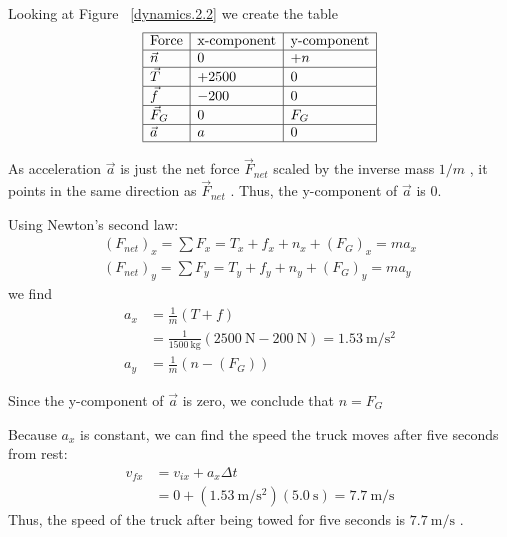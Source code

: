 \begin{Answer}[ref={dynamics.2.1}]

    Looking at Figure~%
    \ref{dynamics.2.2} we create the table
    \begin{equation}
        \label{dynamics.2.1-Answer.1}
        \begin{array}{|l|l|l|}
            \hline
            \text{Force} & \text{x-component} & \text{y-component} \\
            \hline
            \vec{n} & 0 & +n \\
            \hline
            \vec{T} & +2500 & 0 \\
            \hline
            \vec{f} & -200 & 0 \\
            \hline
            \vec{F}_G & 0 & F_G \\
            \hline
            \vec{a} & a & 0 \\
            \hline
        \end{array}
    \end{equation}
    \begin{remark}
        As acceleration
        $
            \vec{a}
        $ is just the net force
        $
            \vec{F}_{net}
        $ scaled by the inverse mass
        $
            1/m
        $%
        , it points in the same direction as
        $
            \vec{F}_{net}
        $%
.        Thus, the y-component of
        $
            \vec{a}
        $ is 0.
    \end{remark}

    Using Newton's second law:
    \begin{equation}
        \begin{split}
            (F_{net})_x=\sum F_x=T_x+f_x+n_x+(F_G)_x=ma_x \\
            (F_{net})_y=\sum F_y=T_y+f_y+n_y+(F_G)_y=ma_y
        \end{split}
    \end{equation}
    we find
    \begin{align}
        a_x &= \frac{1}{m}(T+f) \\
        &= \frac{1}{\qty{1500}{\kilo\gram}}(\qty{2500}{\newton}-\qty{200}
        {\newton}) = \qty{1.53}{\metre\per\square\second} \\
        a_y &= \frac{1}{m}(n-(F_G))
    \end{align}
    \begin{remark}
        Since the y-component of
        $
            \vec{a}
        $ is zero, we conclude that
        $
            n=F_G
        $
    \end{remark}

    Because
    $
        a_x
    $ is constant, we can find the speed the truck moves after five
    seconds from rest:
    \begin{align}
        v_{fx}&=v_{ix}+a_x\Delta t \\
        &= 0+(\qty{1.53}{\metre\per\square\second})(\qty{5.0}{\second})=\qty
        {7.7}{\metre\per\second}
    \end{align}
    Thus, the speed of the truck after being towed for five seconds is
    $
        \qty{7.7}{\metre\per\second}
    $%
    .
\end{Answer}

